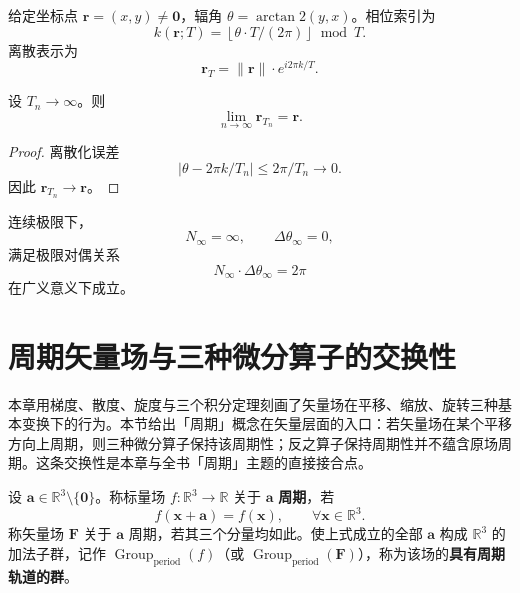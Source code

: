 \begin{definition}[通过方向数和角分辨率确定坐标点]\label{def:coordinate_by_width_bandwidth}
给定坐标点 $\mathbf{r} = (x, y) \neq \mathbf{0}$，辐角 $\theta = \arctan2(y, x)$。相位索引为
\[
k(\mathbf{r}; T) = \left\lfloor \theta \cdot T / (2\pi) \right\rfloor \bmod T.
\]
离散表示为
\[
\mathbf{r}_T = \|\mathbf{r}\| \cdot e^{i2\pi k/T}.
\]
\end{definition}

\begin{theorem}[离散向连续的极限过渡]\label{thm:discrete_to_continuous_limit}
设 $T_n \to \infty$。则
\[
\lim_{n \to \infty} \mathbf{r}_{T_n} = \mathbf{r}.
\]
\end{theorem}

\begin{proof}
离散化误差
\[
|\theta - 2\pi k/T_n| \le 2\pi/T_n \to 0.
\]
因此 $\mathbf{r}_{T_n}\to \mathbf{r}$。
\end{proof}

\begin{definition}[连续方向数与连续角分辨率]\label{def:continuous_width_bandwidth}
连续极限下，
\[
N_{\infty} = \infty, \qquad \Delta\theta_{\infty} = 0,
\]
满足极限对偶关系
\[
N_{\infty} \cdot \Delta\theta_{\infty} = 2\pi
\]
在广义意义下成立。
\end{definition}

\section{周期矢量场与三种微分算子的交换性}
\label{sec:periodic_vector_fields}

本章用梯度、散度、旋度与三个积分定理刻画了矢量场在平移、缩放、旋转三种基本变换下的行为。本节给出「周期」概念在矢量层面的入口：若矢量场在某个平移方向上周期，则三种微分算子保持该周期性；反之算子保持周期性并不蕴含原场周期。这条交换性是本章与全书「周期」主题的直接接合点。

\begin{definition}[周期标量场与周期矢量场]\label{def:periodic_vector_field}
设 $\mathbf a\in\mathbb R^3\setminus\{\mathbf 0\}$。称标量场 $f:\mathbb R^3\to\mathbb R$ 关于 $\mathbf a$ \textbf{周期}，若
\[
f(\mathbf x+\mathbf a)=f(\mathbf x),\qquad \forall \mathbf x\in\mathbb R^3 .
\]
称矢量场 $\mathbf F$ 关于 $\mathbf a$ 周期，若其三个分量均如此。使上式成立的全部 $\mathbf a$ 构成 $\mathbb R^3$ 的加法子群，记作 $\operatorname{Group}_{\mathrm{period}}(f)$（或 $\operatorname{Group}_{\mathrm{period}}(\mathbf F)$），称为该场的\textbf{具有周期轨道的群}。
\end{definition}

